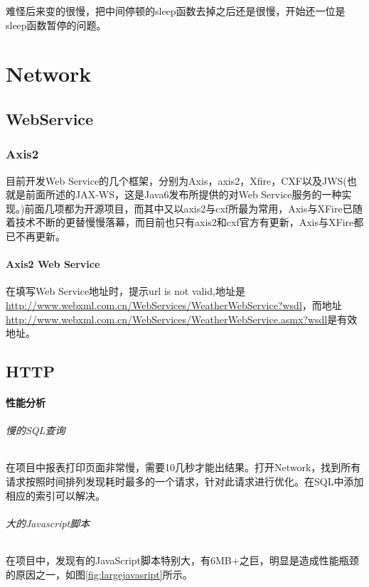 \documentclass[letter]{book}
\begin{document}
难怪后来变的很慢，把中间停顿的sleep函数去掉之后还是很慢，开始还一位是sleep函数暂停的问题。

\part{Network}

\chapter{WebService}

\section{Axis2}

目前开发Web Service的几个框架，分别为Axis，axis2，Xfire，CXF以及JWS(也就是前面所述的JAX-WS，这是Java6发布所提供的对Web Service服务的一种实现。)前面几项都为开源项目，而其中又以axis2与cxf所最为常用，Axis与XFire已随着技术不断的更替慢慢落幕，而目前也只有axis2和cxf官方有更新，Axis与XFire都已不再更新。

\subsection{Axis2 Web Service}

在填写Web Service地址时，提示url is not valid,地址是\url{http://www.webxml.com.cn/WebServices/WeatherWebService?wsdl}，而地址\url{http://www.webxml.com.cn/WebServices/WeatherWebService.asmx?wsdl}是有效地址。

\chapter{HTTP}


\subsection{性能分析}

\paragraph{慢的SQL查询}

在项目中报表打印页面非常慢，需要10几秒才能出结果。打开Network，找到所有请求按照时间排列发现耗时最多的一个请求，针对此请求进行优化。在SQL中添加相应的索引可以解决。

\paragraph{大的Javascript脚本}在项目中，发现有的JavaScript脚本特别大，有6MB+之巨，明显是造成性能瓶颈的原因之一，如图\ref{fig:largejavasript}所示。
\end{document}
